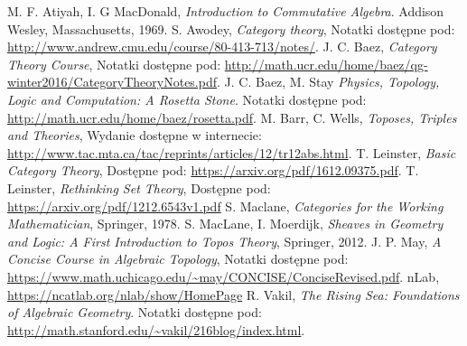 \begin{thebibliography}{99}
  M. F. Atiyah, I. G MacDonald,
  \emph{Introduction to Commutative Algebra}.
  Addison Wesley, Massachusetts, 1969.
  S. Awodey,
  \emph{Category theory},
  Notatki dostępne pod: \url{http://www.andrew.cmu.edu/course/80-413-713/notes/}.
    J. C. Baez,
    \emph{Category Theory Course},
    Notatki dostępne pod:
    \url{http://math.ucr.edu/home/baez/qg-winter2016/CategoryTheoryNotes.pdf}.
    J. C. Baez, M. Stay
    \emph{Physics, Topology, Logic and Computation: A Rosetta Stone}.
    Notatki dostępne pod: \url{http://math.ucr.edu/home/baez/rosetta.pdf}.
  M. Barr, C. Wells,
  \emph{Toposes, Triples and Theories},
  Wydanie dostępne w internecie: \url{http://www.tac.mta.ca/tac/reprints/articles/12/tr12abs.html}.
  T. Leinster,
  \emph{Basic Category Theory},
  Dostępne pod: \url{https://arxiv.org/pdf/1612.09375.pdf}.
  T. Leinster,
  \emph{Rethinking Set Theory},
  Dostępne pod: \url{https://arxiv.org/pdf/1212.6543v1.pdf}
  S. Maclane,
  \emph{Categories for the Working Mathematician},
  Springer, 1978.
  S. MacLane, I. Moerdijk,
  \emph{Sheaves in Geometry and Logic: A First Introduction to Topos Theory},
  Springer, 2012.
  J. P. May,
  \emph{A Concise Course in Algebraic Topology},
  Notatki dostępne pod: \url{https://www.math.uchicago.edu/~may/CONCISE/ConciseRevised.pdf}.
  nLab,
  \url{https://ncatlab.org/nlab/show/HomePage}
    R. Vakil,
    \emph{The Rising Sea: Foundations of Algebraic Geometry}.
    Notatki dostępne pod: \url{http://math.stanford.edu/~vakil/216blog/index.html}.
\end{thebibliography}
